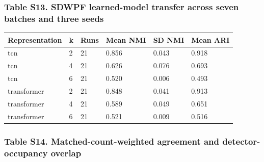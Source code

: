 \documentclass[a4paper,11pt]{article}
\newcounter{none}
\begin{document}
\subsubsection{Table S13. SDWPF learned-model transfer across seven batches and three seeds}\label{table-s13.-sdwpf-learned-model-transfer-across-seven-batches-and-three-seeds}

{\def\LTcaptype{none} %
\begin{longtable}[]{@{}llllll@{}}
\toprule\noalign{}
Representation & k & Runs & Mean NMI & SD NMI & Mean ARI \\
\midrule\noalign{}
\endhead
\bottomrule\noalign{}
\endlastfoot
tcn & 2 & 21 & 0.856 & 0.043 & 0.918 \\
tcn & 4 & 21 & 0.626 & 0.076 & 0.693 \\
tcn & 6 & 21 & 0.520 & 0.006 & 0.493 \\
transformer & 2 & 21 & 0.848 & 0.041 & 0.913 \\
transformer & 4 & 21 & 0.589 & 0.049 & 0.651 \\
transformer & 6 & 21 & 0.521 & 0.009 & 0.516 \\
\end{longtable}
}

\subsubsection{Table S14. Matched-count-weighted agreement and detector-occupancy overlap}\label{table-s14.-matched-count-weighted-agreement-and-detector-occupancy-overlap}
\end{document}
